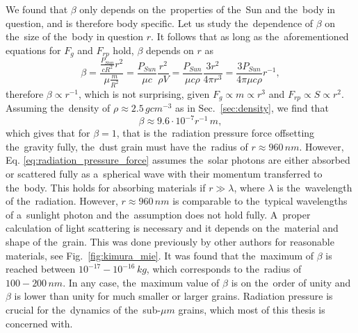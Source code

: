 We found that $\beta$ only depends on the~properties of the~Sun and the~body in question, and is therefore body specific. Let us study the~dependence of $\beta$ on the~size of the~body in question $r$. It follows that as long as the~aforementioned equations for $F_{g}$ and $F_{rp}$ hold, $\beta$ depends on $r$ as 
\begin{equation} 
    \beta = \frac{\frac{P_{Sun}}{c R^2} r^2}{\mu \frac{m}{R^2}} = \frac{P_{Sun}}{\mu c} \frac{r^2}{\rho V} = \frac{P_{Sun}}{\mu c \rho} \frac{3 r^2}{4 \pi r^3} = \frac{3 P_{Sun}}{4 \pi \mu c \rho} r^{-1},
\end{equation}
therefore $\beta \propto r^{-1}$, which is not surprising, given $F_{g} \propto m \propto r^{3}$ and 
$F_{rp} \propto S \propto r^{2}$. Assuming the~density of $\rho \approx 2.5 \, \si{gcm^{-3}}$ as in Sec.~\ref{sec:density}, we find that 
\begin{equation}
    \beta \approx 9.6 \cdot 10^{-7} r^{-1} \, \si{m},
    \label{eq:beta_estimate}
\end{equation}
which gives that for $\beta = 1$, that is the~radiation pressure force offsetting the~gravity fully, the~dust grain must have the~radius of $r \approx 960 \, \si{nm}$. However, Eq. \eqref{eq:radiation_pressure_force} assumes the~solar photons are either absorbed or scattered fully as a~spherical wave with their momentum transferred to the~body. This holds for absorbing materials if $r \gg \lambda$, where $\lambda$ is the~wavelength of the~radiation. However, $r \approx 960 \, \si{nm}$ is comparable to the~typical wavelengths of a~sunlight photon and the~assumption does not hold fully. A~proper calculation of light scattering is necessary and it depends on the~material and shape of the~grain. This was done previously by other authors \citep{kimura2003composition} for reasonable materials, see Fig.~\ref{fig:kimura_mie}. It was found that the~maximum of $\beta$ is reached between $10^{-17} - 10^{-16} \, \si{kg}$, which corresponds to the~radius of $100 - 200 \, \si{nm}$. In any case, the~maximum value of $\beta$ is on the~order of unity and $\beta$ is lower than unity for much smaller or larger grains. Radiation pressure is crucial for the~dynamics of the~sub-$\si{\mu m}$ grains, which most of this thesis is concerned with.

